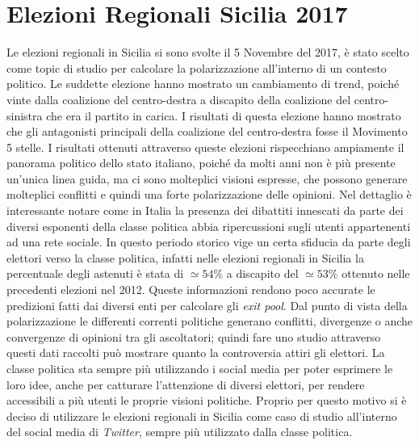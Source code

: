 \section{Elezioni Regionali Sicilia 2017}
\label{EleSicilia}
Le elezioni regionali in Sicilia si sono svolte il 5 Novembre del 2017, è stato scelto come topic di studio per calcolare la polarizzazione all'interno di un contesto politico. Le suddette elezione hanno mostrato un cambiamento di trend, poiché vinte dalla coalizione del centro-destra a discapito della coalizione del centro-sinistra che era il partito in carica. I risultati di questa elezione hanno mostrato che gli antagonisti principali della coalizione del centro-destra fosse il Movimento 5 stelle.
I risultati ottenuti attraverso queste elezioni rispecchiano ampiamente il panorama politico dello stato italiano, poiché da molti anni non è più presente un'unica linea guida, ma ci sono molteplici visioni espresse, che possono generare molteplici conflitti e quindi una forte polarizzazione delle opinioni. Nel dettaglio è interessante notare come in Italia la presenza dei dibattiti innescati da parte dei diversi esponenti della classe politica abbia ripercussioni sugli utenti appartenenti ad una rete sociale.
In questo periodo storico vige un certa sfiducia da parte degli elettori verso la classe politica, infatti nelle elezioni regionali in Sicilia la percentuale degli astenuti è stata di $\simeq 54\%$ a discapito del $\simeq 53\%$ ottenuto nelle precedenti elezioni nel 2012. Queste informazioni rendono poco accurate le predizioni fatti dai diversi enti per calcolare gli \textit{exit pool}.\cite{ElezioniSondaggi}
Dal punto di vista della polarizzazione le differenti correnti politiche generano conflitti, divergenze o anche convergenze di opinioni tra gli ascoltatori; quindi fare uno studio attraverso questi dati raccolti può mostrare quanto la controversia attiri gli elettori.
La classe politica sta sempre più utilizzando i social media per poter esprimere le loro idee, anche per catturare l'attenzione di diversi elettori, per rendere accessibili a più utenti le proprie visioni politiche. 
Proprio per questo motivo si è deciso di utilizzare le elezioni regionali in Sicilia come caso di studio all'interno del social media di \textit{Twitter}, sempre più utilizzato dalla classe politica.

